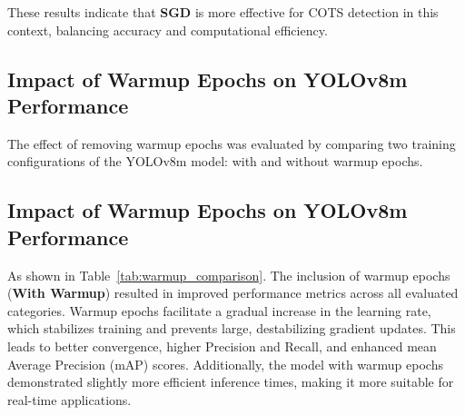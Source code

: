 \documentclass[conference]{IEEEtran}
\begin{document}
These results indicate that \textbf{SGD} is more effective for COTS detection in this context, balancing accuracy and computational efficiency.

\subsection{Impact of Warmup Epochs on YOLOv8m Performance}

The effect of removing warmup epochs was evaluated by comparing two training configurations of the YOLOv8m model: with and without warmup epochs.

\begin{table}[htbp]
    \centering
    \caption{Comparison of YOLOv8m Performance with and without Warmup Epochs}
    \label{tab:warmup_comparison}
\end{table}

\subsection{Impact of Warmup Epochs on YOLOv8m Performance}

As shown in Table~\ref{tab:warmup_comparison}. The inclusion of warmup epochs (\textbf{With Warmup}) resulted in improved performance metrics across all evaluated categories. Warmup epochs facilitate a gradual increase in the learning rate, which stabilizes training and prevents large, destabilizing gradient updates. This leads to better convergence, higher Precision and Recall, and enhanced mean Average Precision (mAP) scores. Additionally, the model with warmup epochs demonstrated slightly more efficient inference times, making it more suitable for real-time applications.
\end{document}
